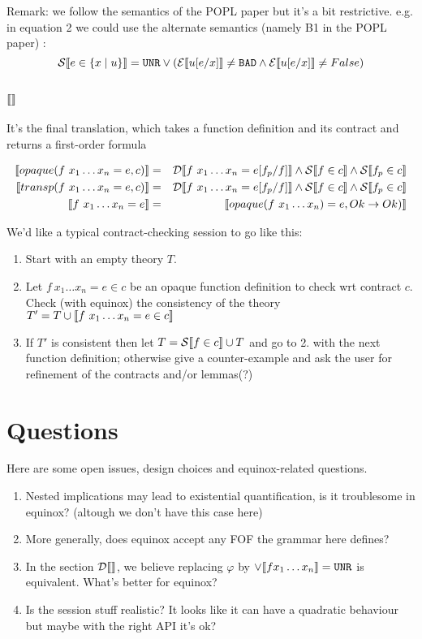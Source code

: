 \documentclass{article}
\begin{document}
Remark: we follow the semantics of the POPL paper but it's a bit restrictive.
e.g. in equation 2 we could use the alternate semantics (namely B1 in the POPL paper) : 
$$\mathcal{S} \llbracket e \in \{x \mid u \} \rrbracket = \texttt{UNR} \lor (\mathcal{E} \llbracket u[e/x] \rrbracket \neq \texttt{BAD} \land \mathcal{E} \llbracket u[e/x] \rrbracket \neq False)$$

\subsection{$\llbracket  \rrbracket$}
It's the final translation, which takes a function definition and its contract and returns a first-order formula\\

\thispagestyle{empty}

\begin{eqnarray*}
\llbracket opaque(f~x_1 \dots x_n = e,c) \rrbracket &=& \mathcal{D} \llbracket f~x_1 \dots x_n = e[f_p/f] \rrbracket \land \mathcal{S} \llbracket f \in c \rrbracket \land \mathcal{S} \llbracket f_p \in c \rrbracket \\
\llbracket transp(f~x_1 \dots x_n = e,c) \rrbracket &=& \mathcal{D} \llbracket f~x_1 \dots x_n = e[f_p/f] \rrbracket \land \mathcal{S} \llbracket f \in c \rrbracket \land \mathcal{S} \llbracket f_p \in c \rrbracket \\
\llbracket f~x_1 \dots x_n = e \rrbracket &=& \llbracket opaque(f~x_1\dots x_n) = e,Ok \to Ok) \rrbracket \\
\end{eqnarray*}

We'd like a typical contract-checking session to go like this:
\begin{enumerate}
\item Start with an empty theory $T$.
\item Let $f~x_1 \dots x_n = e \in c$ be an opaque function definition to check wrt contract $c$. Check (with equinox) the consistency of the theory $T' = T \cup \llbracket f~x_1 \dots x_n = e \in c \rrbracket$
\item If $T'$ is consistent then let $T = \mathcal{S} \llbracket f \in c \rrbracket \cup T$ and go to 2. with the next function definition; otherwise give a counter-example and ask the user for refinement of the contracts and/or lemmas(?)
\end{enumerate}

\section{Questions}

Here are some open issues, design choices and equinox-related questions.

\begin{enumerate}
\item Nested implications may lead to existential quantification, is it troublesome in equinox? (altough we don't have this case here)
\item More generally, does equinox accept any FOF the grammar here defines?
\item In the section $\mathcal{D} \llbracket  \rrbracket$, we believe replacing $\varphi$ by $\lor \llbracket f x_1 \dots x_n \rrbracket = \texttt{UNR}$ is equivalent. What's better for equinox?
\item Is the session stuff realistic? It looks like it can have a quadratic behaviour but maybe with the right API it's ok?
\end{enumerate}

\thispagestyle{empty}
\end{document}
